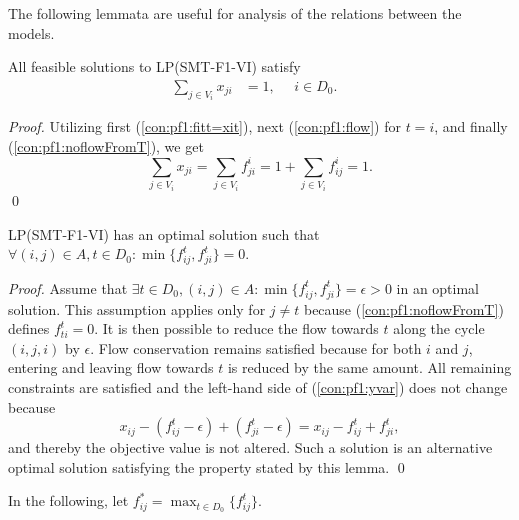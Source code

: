 The following lemmata are useful for analysis of the relations between the models. 
\begin{lemma}\label{lem:sumxji1}
All feasible solutions to LP(SMT-F1-VI) satisfy
\begin{align}
\sum_{j\in V_i}x_{ji}&=1,~~~~~~ i\in D_0. & \label{eq:sumToD} 
\end{align}
\end{lemma}
\begin{proof}
 Utilizing first (\ref{con:pf1:fitt=xit}), next (\ref{con:pf1:flow}) for $t=i$, and finally (\ref{con:pf1:noflowFromT}), we get
$$\sum_{j\in V_i}x_{ji}=\sum_{j\in V_i}f_{ji}^i = 1+\sum_{j\in V_i}f_{ij}^i=1.$$\qed
\end{proof}
\begin{lemma}\label{lem:onedir} LP(SMT-F1-VI) has an optimal solution such that \newline
$\forall (i,j)\in A, t\in D_0: \min\{f_{ij}^t,f_{ji}^t\} = 0.$
\end{lemma}
\begin{proof}
Assume that $\exists t\in D_0, (i,j)\in A: \min\{f_{ij}^t,f_{ji}^t\} = \epsilon> 0$ in an optimal solution. This assumption applies only for $j\neq t$ because (\ref{con:pf1:noflowFromT}) defines $f^t_{ti}=0$.  It is then possible to reduce the flow towards $t$ along the cycle $(i,j,i)$ by $\epsilon$. Flow conservation remains satisfied because for both $i$ and $j$, entering and leaving flow towards $t$ is reduced by the same amount. All remaining constraints are satisfied and the left-hand side of (\ref{con:pf1:yvar}) does not change because 
$$
x_{ij}-(f_{ij}^t-\epsilon)+(f_{ji}^t-\epsilon) = x_{ij}-f_{ij}^t+f_{ji}^t,
$$
and thereby the objective value is not altered. Such a solution is an alternative optimal solution satisfying the property stated by this lemma.  \qed
\end{proof}
In the following, let $f^*_{ij}=\max_{t\in D_0}\{f^t_{ij}\}$.
